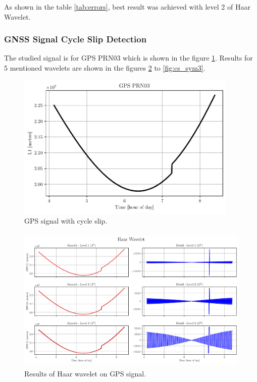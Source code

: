 \documentclass[12pt]{article}
\begin{document}
	As shown in the table \ref{tab:errors}, best result was achieved with level 2 of Haar Wavelet.
	
	\subsubsection{GNSS Signal Cycle Slip Detection}
	
	The studied signal is for GPS PRN03 which is shown in the figure \ref{fig:GPS_Signal}. Results for 5 mentioned wavelets are shown in the figures \ref{fig:cs_haar} to \ref{fig:cs_sym3}.
	
	\begin{figure}[!h]
		\centering
		\includegraphics[height=7cm]{../Tests/Outputs/CycleSlip_MainSignal.pdf}
		\caption{GPS signal with cycle slip.}
		\label{fig:GPS_Signal}
	\end{figure}
	
	\begin{figure}[!h]
		\centering
		\includegraphics[height=7cm]{../Tests/Outputs/CycleSlip_Haar.pdf}
		\caption{Results of Haar wavelet on GPS signal.}
		\label{fig:cs_haar}
	\end{figure}
	
\end{document}

